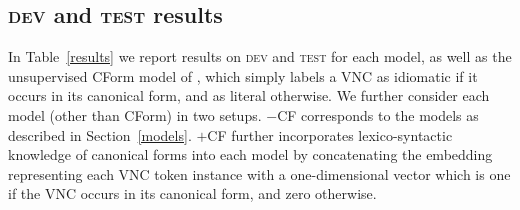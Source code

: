\documentclass[11pt,a4paper]{article}
\newcommand{\secref}[1]{Section~\ref{#1}}
\newcommand{\tabref}[1]{Table~\ref{#1}}
\newcommand{\dev}{\textsc{dev}\xspace}
\newcommand{\test}{\textsc{test}\xspace}
\begin{document}



\subsection{\dev and \test results}


In \tabref{results} we report results on \dev and \test for each
model,
as well as the unsupervised CForm model of ,
which simply labels a VNC as idiomatic if it occurs in its canonical
form, and as literal otherwise. We further consider each model (other
than CForm) in two setups.  $-$CF corresponds to the models as
described in \secref{models}. $+$CF further incorporates
lexico-syntactic knowledge of canonical forms into each model by
concatenating the embedding representing each VNC token instance with
a one-dimensional vector which is one if the VNC occurs in its
canonical form, and zero otherwise.
\end{document}
